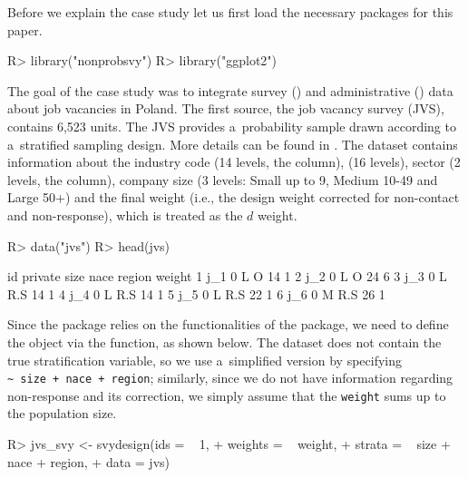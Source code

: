 \documentclass[nojss]{jss}
\begin{document}
Before we explain the case study let us first load the necessary
packages for this paper.

\begin{CodeChunk}
\begin{CodeInput}
R> library("nonprobsvy")
R> library("ggplot2")  
\end{CodeInput}
\end{CodeChunk}

The goal of the case study was to integrate survey () and
administrative () data about job vacancies in Poland. The
first source, the job vacancy survey (JVS), contains 6,523 units. The
JVS provides a~probability sample drawn according to a~stratified
sampling design. More details can be found in \cite{jvs2022}. The
dataset contains information about the industry code (14 levels, the
 column),  (16 levels), sector (2 levels, the
 column), company size (3 levels: Small up to 9, Medium
10-49 and Large 50+) and the final weight (i.e., the design weight
corrected for non-contact and non-response), which is treated as the
\(d\) weight.

\begin{CodeChunk}
\begin{CodeInput}
R> data("jvs")
R> head(jvs)
\end{CodeInput}
\begin{CodeOutput}
   id private size nace region weight
1 j_1       0    L    O     14      1
2 j_2       0    L    O     24      6
3 j_3       0    L  R.S     14      1
4 j_4       0    L  R.S     14      1
5 j_5       0    L  R.S     22      1
6 j_6       0    M  R.S     26      1
\end{CodeOutput}
\end{CodeChunk}

Since the  package relies on the functionalities of the
 package, we need to define the  object via
the  function, as shown below. The dataset does not
contain the true stratification variable, so we use a~simplified version
by specifying \texttt{\textasciitilde{}\ size\ +\ nace\ +\ region};
similarly, since we do not have information regarding non-response and
its correction, we simply assume that the \texttt{weight} sums up to the
population size.

\begin{CodeChunk}
\begin{CodeInput}
R> jvs_svy <- svydesign(ids = ~ 1, 
+                      weights = ~ weight,
+                      strata = ~ size + nace + region,
+                      data = jvs)
\end{CodeInput}
\end{CodeChunk}
\end{document}
